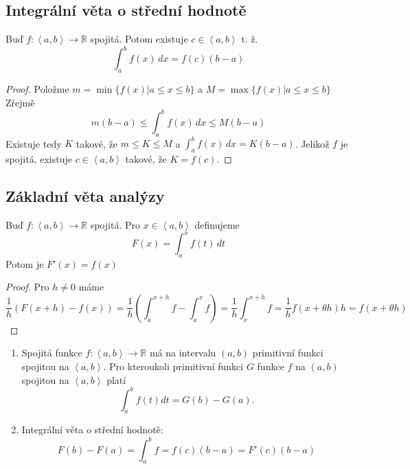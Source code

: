 \documentclass[../main.tex]{subfiles}
\begin{document}
\subsection{Integrální věta o střední hodnotě}
\begin{theorem}
	Buď $f: \left< a,b \right> \to \mathbb{R}$ spojitá. Potom existuje $c \in \left< a,b \right>$ t. ž.
	\[ \int_{a}^{b} f(x) \,dx = f(c)(b-a)\]
\end{theorem}

\begin{proof}
	Položme $m = \min \{ f(x)|a \leq x \leq b \}$ a $M = \max \{ f(x)|a \leq x \leq b \} $
	Zřejmě
	\[ m(b-a) \leq \int_{a}^{b} f(x) \,dx \leq M(b-a) \]
	Existuje tedy $K$ takové, že $m \leq K \leq M$ a $\int_{a}^{b} f(x) \,dx = K(b-a)$.
	Jelikož $f$ je spojitá, existuje $c \in \left< a,b \right>$ takové, že $K = f(c)$.
\end{proof}

\subsection{Základní věta analýzy}
\begin{theorem}
	Buď $f: \left< a,b \right> \to \mathbb{R}$ spojitá. Pro $x \in \left< a,b \right>$ definujeme
	\[ F(x) = \int_{a}^{x} f(t) \,dt \]
	Potom je $F'(x) = f(x)$
\end{theorem}

\begin{proof}
	Pro $h\neq 0$ máme
	\[ \frac{1}{h}(F(x+h) - f(x)) =\frac{1}{h}\left( \int_{a}^{x+h} f - \int_{a}^{x} f \right) =
	\frac{1}{h} \int_{x}^{x+h} f = \frac{1}{h}f(x + \theta h)h = f(x + \theta h) \]
\end{proof}

\begin{consequence}
	\hfill
	\begin{enumerate}
	    \item Spojitá funkce $f : \left<a,b\right> \rightarrow \mathbb{R}$ má na intervalu $(a,b)$ primitivní funkci spojitou na $\left<a,b\right>$.
	          Pro kteroukoli primitivní funkci $G$ funkce $f$ na $(a,b)$ spojitou na $\left<a,b\right>$ platí
	          \[\int^b_a f(t)dt = G(b) - G(a).\]
	    \item Integrální věta o střední hodnotě:
	    \[F(b) - F(a) = \int^b_a f = f(c)(b-a) = F'(c)(b-a)\]
	\end{enumerate}
\end{consequence}
\end{document}
